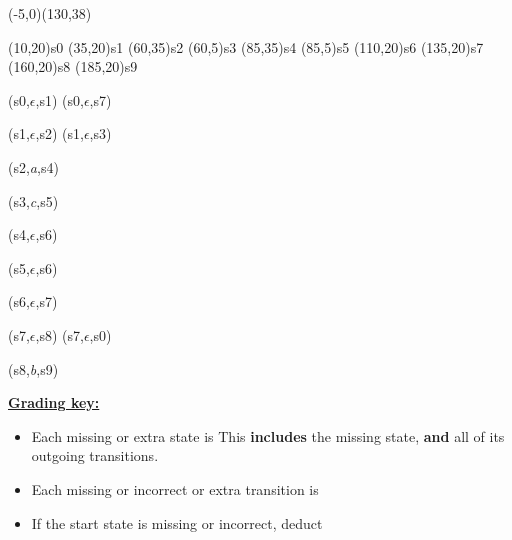 \documentclass[11pt,fleqn]{article}
\begin{document}
\begin{enumerate}
          \begin{automaton}(-5,0)(130,38)


            \state[start](10,20){s0}
            \state(35,20){s1}
            \state(60,35){s2}
            \state(60,5){s3}
            \state(85,35){s4}
            \state(85,5){s5}
            \state(110,20){s6}
            \state(135,20){s7}
            \state(160,20){s8}
            \state[final](185,20){s9}

            \transition(s0,$\epsilon$,s1)
            \transition[curved,angle=48](s0,$\epsilon$,s7)

            \transition(s1,$\epsilon$,s2)
            \transition[labeloffset=-7](s1,$\epsilon$,s3)

            \transition(s2,\emph{a},s4)

            \transition[labeloffset=-7](s3,\emph{c},s5)

            \transition(s4,$\epsilon$,s6)

            \transition[labeloffset=-7](s5,$\epsilon$,s6)

            \transition(s6,$\epsilon$,s7)

            \transition(s7,$\epsilon$,s8)
            \transition[curved,angle=48](s7,$\epsilon$,s0)

            \transition(s8,\emph{b},s9)

          \end{automaton}

          \bigskip

          \begin{info}{\textbf{\underline{Grading key:}}}

            \smallskip

            \begin{itemize}

              \addtolength{\itemsep}{2mm}

              \item Each missing or extra state is  This
                    \textbf{includes} the missing state, \textbf{and} all of
                    its outgoing transitions.

              \item Each missing or incorrect or extra transition is

              \item If the start state is missing or incorrect, deduct


\end{itemize}
\end{info}
\end{enumerate}
\end{document}
